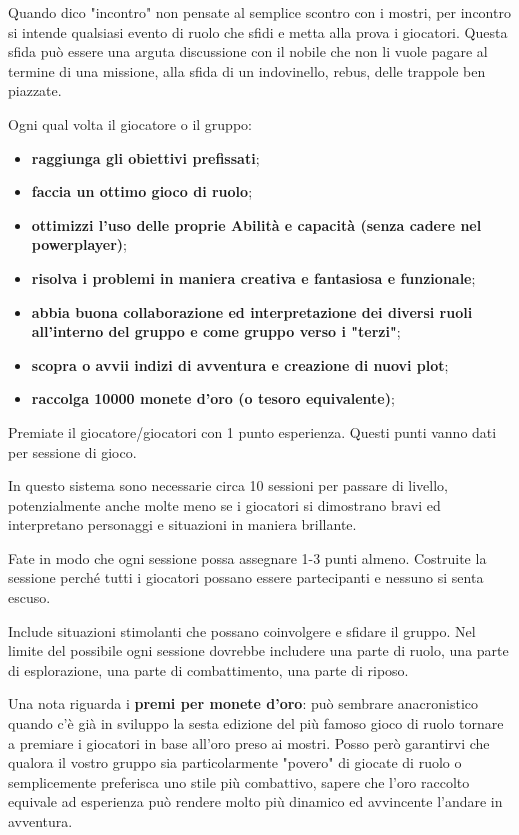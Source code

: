 \documentclass[a4paper,11pt,twoside,openany]{book}
\begin{document}
Quando dico "incontro" non pensate al semplice scontro con i mostri, per incontro si intende qualsiasi evento di ruolo che sfidi e metta alla prova i giocatori. Questa sfida può essere una arguta discussione con il nobile che non li vuole pagare al termine di una missione, alla sfida di un indovinello, rebus, delle trappole ben piazzate.

\bigskip

Ogni qual volta il giocatore o il gruppo:
\begin{itemize}
	\item
	      \textbf{raggiunga gli obiettivi prefissati};
	\item
	      \textbf{faccia un ottimo gioco di ruolo};
	\item
	      \textbf{ottimizzi l'uso delle proprie Abilità e capacità (senza cadere nel powerplayer)};
	\item
	      \textbf{risolva i problemi in maniera creativa e fantasiosa e funzionale};
	\item
	      \textbf{abbia buona collaborazione ed interpretazione dei diversi ruoli all'interno del gruppo e come gruppo verso i "terzi"};
	\item
	      \textbf{scopra o avvii indizi di avventura e creazione di nuovi plot};
	\item
	      \textbf{raccolga 10000 monete d'oro (o tesoro equivalente)};
\end{itemize}

\bigskip

Premiate il giocatore/giocatori con 1 punto esperienza. Questi punti vanno dati per sessione di gioco.

In questo sistema sono necessarie circa 10 sessioni per passare di livello, potenzialmente anche molte meno se i giocatori si dimostrano bravi ed interpretano personaggi e situazioni in maniera brillante.

Fate in modo che ogni sessione possa assegnare 1-3 punti almeno. Costruite la sessione perché tutti i giocatori possano essere partecipanti e nessuno si senta escuso.

Include situazioni stimolanti che possano coinvolgere e sfidare il gruppo.
Nel limite del possibile ogni sessione dovrebbe includere una parte di ruolo, una parte di esplorazione, una parte di combattimento, una parte di riposo.

\bigskip

Una nota riguarda i \textbf{premi per monete d'oro}: può sembrare anacronistico quando c'è già in sviluppo la sesta edizione del più famoso gioco di ruolo tornare a premiare i giocatori in base all'oro preso ai mostri. Posso però garantirvi che qualora il vostro gruppo sia particolarmente "povero" di giocate di ruolo o semplicemente preferisca uno stile più combattivo, sapere che l'oro raccolto equivale ad esperienza può rendere molto più dinamico ed avvincente l'andare in avventura.
\end{document}
